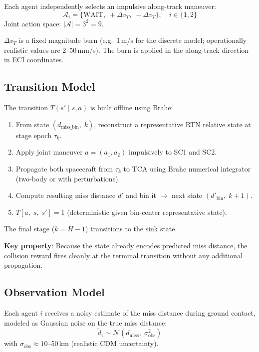 \documentclass[11pt]{article}
\begin{document}
Each agent independently selects an impulsive along-track maneuver:
\begin{equation}
  \mathcal{A}_i = \{\text{WAIT},\; +\Delta v_T,\; -\Delta v_T\}, \quad i \in \{1, 2\}
\end{equation}
Joint action space: $|\mathcal{A}| = 3^2 = 9$.

$\Delta v_T$ is a fixed magnitude burn (e.g.\ 1\,m/s for the discrete model;
operationally realistic values are 2--50\,mm/s). The burn is applied in the
along-track direction in ECI coordinates.

\subsection{Transition Model}

The transition $T(s' \mid s, a)$ is built offline using Brahe:

\begin{enumerate}
  \item From state $(d_\text{miss\_bin},\; k)$, reconstruct a representative
        RTN relative state at stage epoch $\tau_k$.
  \item Apply joint maneuver $a = (a_1, a_2)$ impulsively to SC1 and SC2.
  \item Propagate both spacecraft from $\tau_k$ to TCA using Brahe numerical
        integrator (two-body or with perturbations).
  \item Compute resulting miss distance $d'$ and bin it $\rightarrow$ next state
        $(d'_\text{bin},\; k+1)$.
  \item $T[a,\; s,\; s'] = 1$ (deterministic given bin-center representative state).
\end{enumerate}

The final stage ($k = H-1$) transitions to the sink state.

\noindent\textbf{Key property}: Because the state already encodes predicted miss
distance, the collision reward fires cleanly at the terminal transition without
any additional propagation.

\subsection{Observation Model}

Each agent $i$ receives a noisy estimate of the miss distance during ground
contact, modeled as Gaussian noise on the true miss distance:
\begin{equation}
  \tilde{d}_i \sim \mathcal{N}(d_\text{miss},\; \sigma_\text{obs}^2)
\end{equation}
with $\sigma_\text{obs} \approx 10$--50\,km (realistic CDM uncertainty).
\end{document}
